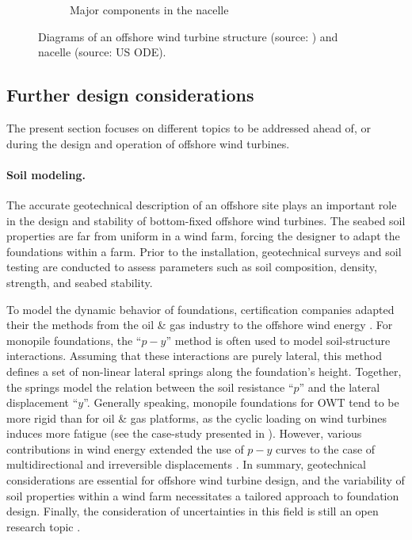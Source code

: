 \begin{figure}
\begin{subfigure}[b]{0.48\textwidth}
        \caption{Major components in the nacelle}
        \label{fig:nacelle_components}
    \end{subfigure}
    \caption{Diagrams of an offshore wind turbine structure (source: \citep{chen_2018_owt_diagram}) and nacelle (source: US ODE).}
    \label{fig:owt_diagram}
\end{figure}

\subsection{Further design considerations}
The present section focuses on different topics to be addressed ahead of, or during the design and operation of offshore wind turbines.

\paragraph{Soil modeling.}
The accurate geotechnical description of an offshore site plays an important role in the design and stability of bottom-fixed offshore wind turbines. 
The seabed soil properties are far from uniform in a wind farm, forcing the designer to adapt the foundations within a farm. 
Prior to the installation, geotechnical surveys and soil testing are conducted to assess parameters such as soil composition, density, strength, and seabed stability. 

To model the dynamic behavior of foundations, certification companies adapted their the methods from the oil \& gas industry to the offshore wind energy \citep{dnv_2018_soil}. 
For monopile foundations, the ``$p-y$'' method is often used to model soil-structure interactions. 
Assuming that these interactions are purely lateral, this method defines a set of non-linear lateral springs along the foundation's height.  
Together, the springs model the relation between the soil resistance ``$p$'' and the lateral displacement ``$y$''. 
Generally speaking, monopile foundations for OWT tend to be more rigid than for oil \& gas platforms, as the cyclic loading on wind turbines induces more fatigue (see the case-study presented in \citet{le_2014_geotech_casestudy}).  
However, various contributions in wind energy extended the use of $p-y$ curves to the case of multidirectional and irreversible displacements \citep{lovera_2019_thesis}. 
In summary, geotechnical considerations are essential for offshore wind turbine design, and the variability of soil properties within a wind farm necessitates a tailored approach to foundation design. 
Finally, the consideration of uncertainties in this field is still an open research topic \citep{reale_2021_OWT_soil_uncertainties}.

